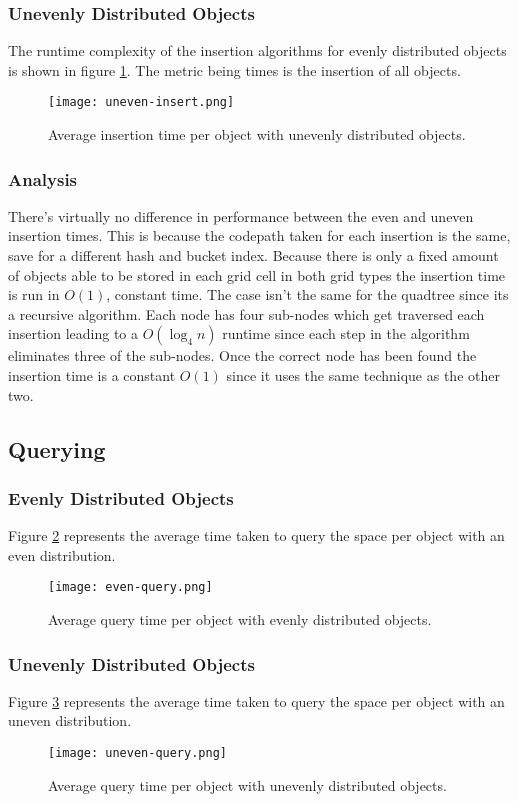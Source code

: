 \documentclass[a4paper, 12pt]{article}
\begin{document}
\subsubsection{Unevenly Distributed Objects}
The runtime complexity of the insertion algorithms for evenly distributed
objects is shown in figure \ref{fig:uneven-insert}. The metric being times is
the insertion of all objects.
\begin{figure}[H]
    \centering
    \caption{Average insertion time per object with unevenly distributed
    objects.}
    \texttt{[image: uneven-insert.png]}
    \label{fig:uneven-insert}
\end{figure}

\subsubsection{Analysis}
There's virtually no difference in performance between the even and uneven
insertion times. This is because the codepath taken for each insertion is the
same, save for a different hash and bucket index. Because there is only a fixed
amount of objects able to be stored in each grid cell in both grid types the
insertion time is run in $O(1)$, constant time. The case isn't the same for the
quadtree since its a recursive algorithm. Each node has four sub-nodes which get
traversed each insertion leading to a $O(\log_4 n)$ runtime since each step in
the algorithm eliminates three of the sub-nodes. Once the correct node has been
found the insertion time is a constant $O(1)$ since it uses the same technique
as the other two.

\subsection{Querying}

\subsubsection{Evenly Distributed Objects}
Figure \ref{fig:even-query} represents the average time taken to query the space
per object with an even distribution.
\begin{figure}[H]
    \centering
    \caption{Average query time per object with evenly distributed objects.}
    \texttt{[image: even-query.png]}
    \label{fig:even-query}
\end{figure}

\subsubsection{Unevenly Distributed Objects}
Figure \ref{fig:uneven-query} represents the average time taken to query the space
per object with an uneven distribution.
\begin{figure}[H]
    \centering
    \caption{Average query time per object with unevenly distributed objects.}
    \texttt{[image: uneven-query.png]}
    \label{fig:uneven-query}
\end{figure}
\end{document}
